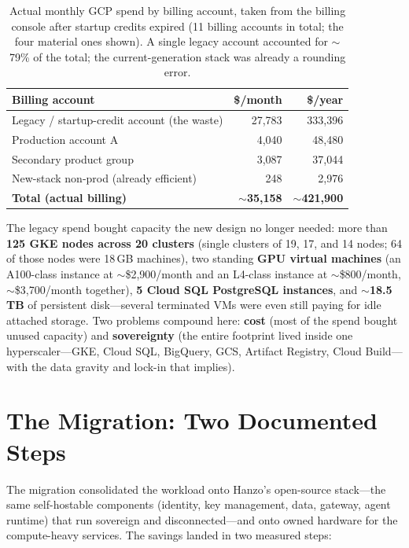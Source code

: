 \documentclass[11pt,letterpaper]{article}
\begin{document}
\begin{table}[h]
\centering
\small
\begin{tabular}{p{} r r}
\toprule
\textbf{Billing account} & \textbf{\$/month} & \textbf{\$/year} \\
\midrule
Legacy / startup-credit account (the waste) & 27{,}783 & 333{,}396 \\
Production account A & 4{,}040 & 48{,}480 \\
Secondary product group & 3{,}087 & 37{,}044 \\
New-stack non-prod (already efficient) & 248 & 2{,}976 \\
\midrule
\textbf{Total (actual billing)} & \textbf{$\sim$35{,}158} & \textbf{$\sim$421{,}900} \\
\bottomrule
\end{tabular}
\caption{Actual monthly GCP spend by billing account, taken from the billing
console after startup credits expired (11 billing accounts in total; the four
material ones shown). A single legacy account accounted for $\sim$79\% of the total;
the current-generation stack was already a rounding error.}
\end{table}

The legacy spend bought capacity the new design no longer needed: more than
\textbf{125 GKE nodes across 20 clusters} (single clusters of 19, 17, and 14 nodes;
64 of those nodes were 18\,GB machines), two standing \textbf{GPU virtual machines}
(an A100-class instance at $\sim$\$2{,}900/month and an L4-class instance at
$\sim$\$800/month, $\sim$\$3{,}700/month together), \textbf{5 Cloud SQL PostgreSQL
instances}, and $\sim$\textbf{18.5\,TB} of persistent disk---several terminated VMs
were even still paying for idle attached storage. Two problems compound here:
\textbf{cost} (most of the spend bought unused capacity) and \textbf{sovereignty}
(the entire footprint lived inside one hyperscaler---GKE, Cloud SQL, BigQuery, GCS,
Artifact Registry, Cloud Build---with the data gravity and lock-in that implies).

\section{The Migration: Two Documented Steps}

The migration consolidated the workload onto Hanzo's open-source stack---the same
self-hostable components (identity, key management, data, gateway, agent runtime)
that run sovereign and disconnected---and onto owned hardware for the
compute-heavy services. The savings landed in two measured steps:
\end{document}
